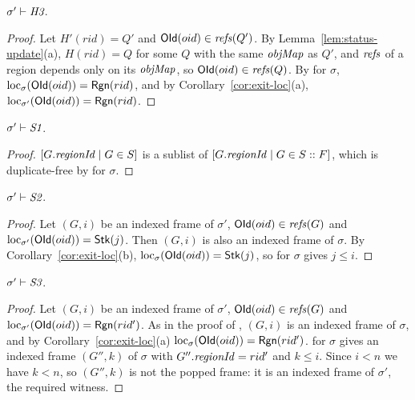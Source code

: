 \begin{lemma}[\inv{H3}] 
$\sigma' \vdash \textit{H3}$.
\end{lemma}
\begin{proof}
Let $H'(rid) = Q'$ and $\mathsf{OId}(oid) \in \mathit{refs}(Q')$. By Lemma~\ref{lem:status-update}(a),
$H(rid) = Q$ for some $Q$ with the same $\mathit{objMap}$ as $Q'$, and $\mathit{refs}$ of a region depends only on its
$\mathit{objMap}$, so $\mathsf{OId}(oid) \in \mathit{refs}(Q)$. By  for $\sigma$,
$\mathrm{loc}_{\sigma}(\mathsf{OId}(oid)) = \mathsf{Rgn}(rid)$, and by Corollary~\ref{cor:exit-loc}(a),
$\mathrm{loc}_{\sigma'}(\mathsf{OId}(oid)) = \mathsf{Rgn}(rid)$.
\end{proof}

\begin{lemma}[\inv{S1}] 
$\sigma' \vdash \textit{S1}$.
\end{lemma}
\begin{proof}
$[G.\mathit{regionId} \mid G \in S]$ is a sublist of $[G.\mathit{regionId} \mid G \in S :: F]$, which is duplicate-free by
 for $\sigma$.
\end{proof}

\begin{lemma}[\inv{S2}] 
$\sigma' \vdash \textit{S2}$.
\end{lemma}
\begin{proof}
Let $(G, i)$ be an indexed frame of $\sigma'$, $\mathsf{OId}(oid) \in \mathit{refs}(G)$ and
$\mathrm{loc}_{\sigma'}(\mathsf{OId}(oid)) = \mathsf{Stk}(j)$. Then $(G,i)$ is also an indexed frame of $\sigma$. By Corollary~\ref{cor:exit-loc}(b),
$\mathrm{loc}_{\sigma}(\mathsf{OId}(oid)) = \mathsf{Stk}(j)$, so  for $\sigma$ gives $j \le i$.
\end{proof}

\begin{lemma}[\inv{S3}] 
$\sigma' \vdash \textit{S3}$.
\end{lemma}
\begin{proof}
Let $(G, i)$ be an indexed frame of $\sigma'$, $\mathsf{OId}(oid) \in \mathit{refs}(G)$ and
$\mathrm{loc}_{\sigma'}(\mathsf{OId}(oid)) = \mathsf{Rgn}(rid')$. As in the proof of , $(G, i)$ is an indexed frame of $\sigma$, and by Corollary~\ref{cor:exit-loc}(a)
$\mathrm{loc}_{\sigma}(\mathsf{OId}(oid)) = \mathsf{Rgn}(rid')$.  for $\sigma$ gives an indexed frame $(G'', k)$ of $\sigma$
with $G''.\mathit{regionId} = rid'$ and $k \le i$. Since $i < n$ we have $k < n$, so $(G'', k)$ is not the popped
frame: it is an indexed frame of $\sigma'$, the required witness.
\end{proof}

